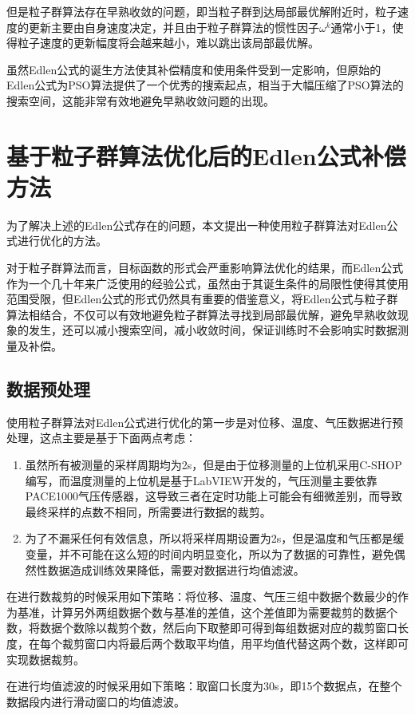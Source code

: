 但是粒子群算法存在早熟收敛的问题，即当粒子群到达局部最优解附近时，粒子速度的更新主要由自身速度决定，并且由于粒子群算法的惯性因子\(\omega^k\)通常小于1，使得粒子速度的更新幅度将会越来越小，难以跳出该局部最优解\cite{范培蕾2009克服早熟收敛现象的粒子群优化算法}。

虽然Edlen公式的诞生方法使其补偿精度和使用条件受到一定影响，但原始的Edlen公式为PSO算法提供了一个优秀的搜索起点，相当于大幅压缩了PSO算法的搜索空间，这能非常有效地避免早熟收敛问题的出现。

\section{基于粒子群算法优化后的Edlen公式补偿方法}
为了解决上述的Edlen公式存在的问题，本文提出一种使用粒子群算法对Edlen公式进行优化的方法。

对于粒子群算法而言，目标函数的形式会严重影响算法优化的结果，而Edlen公式作为一个几十年来广泛使用的经验公式，虽然由于其诞生条件的局限性使得其使用范围受限，但Edlen公式的形式仍然具有重要的借鉴意义，将Edlen公式与粒子群算法相结合，不仅可以有效地避免粒子群算法寻找到局部最优解，避免早熟收敛现象的发生，还可以减小搜索空间，减小收敛时间，保证训练时不会影响实时数据测量及补偿。
\subsection{数据预处理}
使用粒子群算法对Edlen公式进行优化的第一步是对位移、温度、气压数据进行预处理，这点主要是基于下面两点考虑：
\begin{enumerate}
  \item 虽然所有被测量的采样周期均为2s，但是由于位移测量的上位机采用C-SHOP编写，而温度测量的上位机是基于LabVIEW开发的，气压测量主要依靠PACE1000气压传感器，这导致三者在定时功能上可能会有细微差别，而导致最终采样的点数不相同，所需要进行数据的裁剪。
  \item 为了不漏采任何有效信息，所以将采样周期设置为2s，但是温度和气压都是缓变量，并不可能在这么短的时间内明显变化，所以为了数据的可靠性，避免偶然性数据造成训练效果降低，需要对数据进行均值滤波。
\end{enumerate}

在进行数裁剪的时候采用如下策略：将位移、温度、气压三组中数据个数最少的作为基准，计算另外两组数据个数与基准的差值，这个差值即为需要裁剪的数据个数，将数据个数除以裁剪个数，然后向下取整即可得到每组数据对应的裁剪窗口长度，在每个裁剪窗口内将最后两个数取平均值，用平均值代替这两个数，这样即可实现数据裁剪。

在进行均值滤波的时候采用如下策略：取窗口长度为30s，即15个数据点，在整个数据段内进行滑动窗口的均值滤波。

